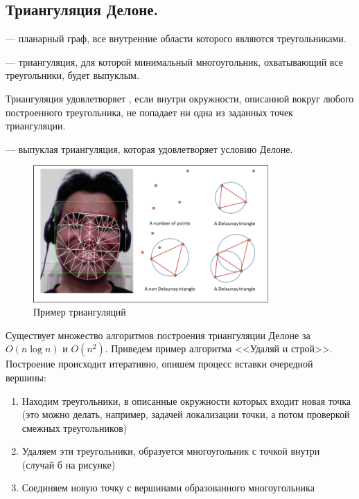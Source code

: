 \subsection{Триангуляция Делоне.}
\begin{definition}
   --- планарный граф, все внутренние области которого являются треугольниками. 
\end{definition}

\begin{definition}
   --- триангуляция, для которой минимальный многоугольник, охватывающий
  все треугольники, будет выпуклым.
\end{definition}

\begin{definition}
  Триангуляция удовлетворяет , если внутри окружности, описанной вокруг
  любого построенного треугольника, не попадает ни одна из заданных точек триангуляции.
\end{definition}

\begin{definition}
   --- выпуклая триангуляция, которая удовлетворяет условию Делоне.
\end{definition}

\begin{figure}[H]    
  \centering    
  \includegraphics[width=0.8\textwidth]{figures/deloneExample.png}    
  \caption*{Пример триангуляций}        
\end{figure} 

Существует множество алгоритмов построения триангуляции Делоне за $O(n \log n)$ и $O(n^2)$. 
Приведем пример алгоритма <<Удаляй и строй>>.
Построение происходит итеративно, опишем процесс вставки очередной вершины:
\begin{enumerate}
  \item Находим треугольники, в описанные окружности которых входит новая точка (это можно делать, например,
    задачей локализации точки, а потом проверкой смежных треугольников)
  \item Удаляем эти треугольники, образуется многоугольник с точкой внутри (случай б на рисунке)
  \item Соединяем новую точку с вершинами образованного многоугольника
\end{enumerate}

